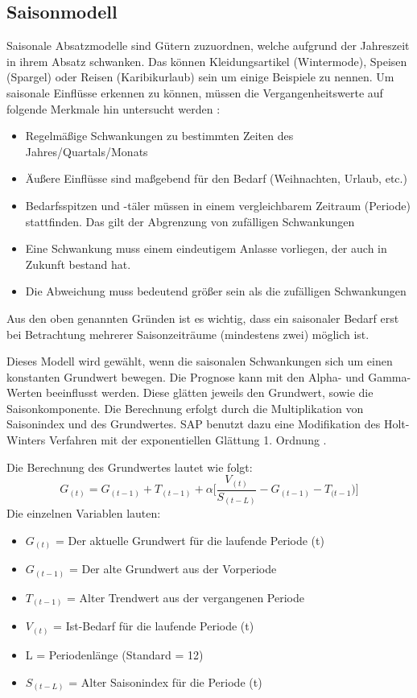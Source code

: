 \subsection{Saisonmodell}
Saisonale Absatzmodelle sind Gütern zuzuordnen, welche aufgrund der Jahreszeit in ihrem Absatz schwanken. Das können Kleidungsartikel (Wintermode), Speisen (Spargel) oder Reisen (Karibikurlaub) sein um einige Beispiele zu nennen.
Um saisonale Einflüsse erkennen zu können, müssen die Vergangenheitswerte auf folgende Merkmale hin untersucht werden \cite[S.~25]{Larouque2010}:
\begin{itemize}
	\item Regelmäßige Schwankungen zu bestimmten Zeiten des Jahres/Quartals/Monats
	\item Äußere Einflüsse sind maßgebend für den Bedarf (Weihnachten, Urlaub, etc.)
	\item Bedarfsspitzen und -täler müssen in einem vergleichbarem Zeitraum (Periode) stattfinden. Das gilt der Abgrenzung von zufälligen Schwankungen
	\item Eine Schwankung muss einem eindeutigem Anlasse vorliegen, der auch in Zukunft bestand hat.
	\item Die Abweichung muss bedeutend größer sein als die zufälligen Schwankungen
\end{itemize}
Aus den oben genannten Gründen ist es wichtig, dass ein saisonaler Bedarf erst bei Betrachtung mehrerer Saisonzeiträume (mindestens zwei) möglich ist.

Dieses Modell wird gewählt, wenn die saisonalen Schwankungen sich um einen konstanten Grundwert bewegen. Die Prognose kann mit den Alpha- und Gamma-Werten beeinflusst werden. Diese glätten jeweils den Grundwert, sowie die Saisonkomponente.
Die Berechnung erfolgt durch die Multiplikation von Saisonindex und des Grundwertes. 
SAP benutzt dazu eine Modifikation des Holt-Winters Verfahren mit der exponentiellen Glättung 1. Ordnung \cite{SAPDOCTSM}.

Die Berechnung des Grundwertes lautet wie folgt:
\begin{equation}
	G_{(t)} = G_{(t-1) }+ T_{(t-1)} + \alpha \big[\dfrac{V_{(t)}}{S_{(t-L)}} - G_{(t-1)} - T_{(t-1}) \big]
\end{equation}
Die einzelnen Variablen lauten:
\begin{itemize}
	\item $G_{(t)}$ = Der aktuelle Grundwert für die laufende Periode (t)
	\item $G_{(t - 1)}$ = Der alte Grundwert aus der Vorperiode
	\item $T_{(t - 1)}$ = Alter Trendwert aus der vergangenen Periode
	\item $V_{(t)}$ = Ist-Bedarf für die laufende Periode (t)
	\item L = Periodenlänge (Standard = 12)
	\item $S_{(t - L)}$ = Alter Saisonindex für die Periode (t)
\end{itemize}

